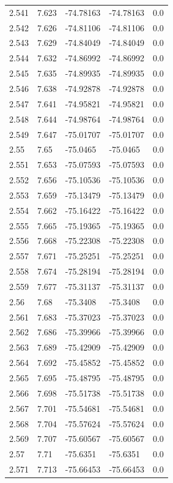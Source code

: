 \begin{tabular}{lllll}
2.541 & 7.623 & -74.78163 & -74.78163 & 0.0 \\
2.542 & 7.626 & -74.81106 & -74.81106 & 0.0 \\
2.543 & 7.629 & -74.84049 & -74.84049 & 0.0 \\
2.544 & 7.632 & -74.86992 & -74.86992 & 0.0 \\
2.545 & 7.635 & -74.89935 & -74.89935 & 0.0 \\
2.546 & 7.638 & -74.92878 & -74.92878 & 0.0 \\
2.547 & 7.641 & -74.95821 & -74.95821 & 0.0 \\
2.548 & 7.644 & -74.98764 & -74.98764 & 0.0 \\
2.549 & 7.647 & -75.01707 & -75.01707 & 0.0 \\
2.55 & 7.65 & -75.0465 & -75.0465 & 0.0 \\
2.551 & 7.653 & -75.07593 & -75.07593 & 0.0 \\
2.552 & 7.656 & -75.10536 & -75.10536 & 0.0 \\
2.553 & 7.659 & -75.13479 & -75.13479 & 0.0 \\
2.554 & 7.662 & -75.16422 & -75.16422 & 0.0 \\
2.555 & 7.665 & -75.19365 & -75.19365 & 0.0 \\
2.556 & 7.668 & -75.22308 & -75.22308 & 0.0 \\
2.557 & 7.671 & -75.25251 & -75.25251 & 0.0 \\
2.558 & 7.674 & -75.28194 & -75.28194 & 0.0 \\
2.559 & 7.677 & -75.31137 & -75.31137 & 0.0 \\
2.56 & 7.68 & -75.3408 & -75.3408 & 0.0 \\
2.561 & 7.683 & -75.37023 & -75.37023 & 0.0 \\
2.562 & 7.686 & -75.39966 & -75.39966 & 0.0 \\
2.563 & 7.689 & -75.42909 & -75.42909 & 0.0 \\
2.564 & 7.692 & -75.45852 & -75.45852 & 0.0 \\
2.565 & 7.695 & -75.48795 & -75.48795 & 0.0 \\
2.566 & 7.698 & -75.51738 & -75.51738 & 0.0 \\
2.567 & 7.701 & -75.54681 & -75.54681 & 0.0 \\
2.568 & 7.704 & -75.57624 & -75.57624 & 0.0 \\
2.569 & 7.707 & -75.60567 & -75.60567 & 0.0 \\
2.57 & 7.71 & -75.6351 & -75.6351 & 0.0 \\
2.571 & 7.713 & -75.66453 & -75.66453 & 0.0 \\

\end{tabular}
